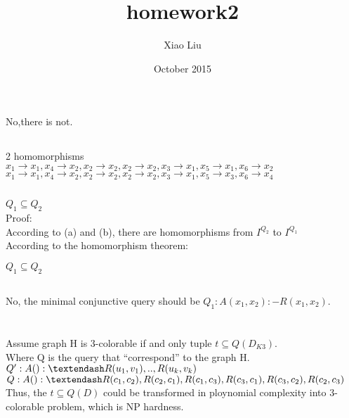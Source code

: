 \documentclass{article}
\title{homework2}
\author{Xiao Liu}
\date{October 2015}
\begin{document}
\maketitle

\section{}
\subsection{}
No,there is not.\\
\subsection{}
2 homomorphisms\\
$x_{1}\rightarrow x_{1},x_{4}\rightarrow x_{2},x_{2}\rightarrow x_{2},x_{2}\rightarrow x_{2},x_{3}\rightarrow x_{1},x_{5}\rightarrow x_{1},x_{6}\rightarrow x_{2}$ \\
$x_{1}\rightarrow x_{1},x_{4}\rightarrow x_{2},x_{2}\rightarrow x_{2},x_{2}\rightarrow x_{2},x_{3}\rightarrow x_{1},x_{5}\rightarrow x_{3},x_{6}\rightarrow x_{4}$ \\
\subsection{}
$Q_{1}\subseteq Q_{2}$\\
Proof:\\
According to (a) and (b), there are homomorphisms from $I^{Q_{2}}$ to $I^{Q_{1}}$\\
According to the homomorphism theorem:\\
\begin{center}
  $Q_{1}\subseteq Q_{2}$
\end{center}
\subsection{}
No, the minimal conjunctive query should be $Q_{1}:A(x_{1},x_{2}):-R(x_{1},x_{2})$.\\
\section{}
Assume graph H is 3-colorable if and only tuple $t\subseteq Q(D_{K3})$.\\
Where Q is the query that ``correspond'' to the graph H.\\
$Q':A():\textendash R(u_{1},v_{1}),..,R(u_{k},v_{k})$\\
$Q:A():\textendash R(c_{1},c_{2}),R(c_{2},c_{1}),R(c_{1},c_{3}),R(c_{3},c_{1}),R(c_{3},c_{2}),R(c_{2},c_{3})$\\
Thus, the $t\subseteq Q(D)$ could be transformed in ploynomial complexity into 3-colorable problem, which is NP hardness.\\
\end{document}
